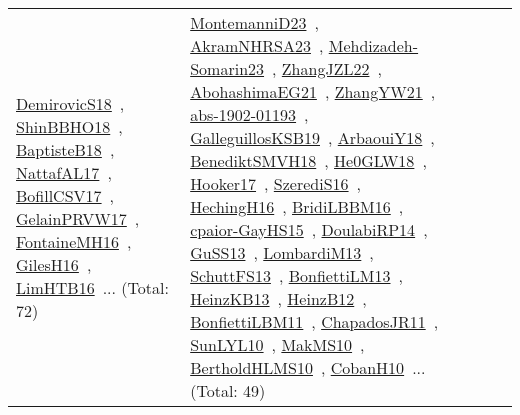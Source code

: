 {\begin{longtable}{lp{3cm}>{\raggedright\arraybackslash}p{6cm}>{\raggedright\arraybackslash}p{6cm}>{\raggedright\arraybackslash}p{8cm}}
\href{papers/DemirovicS18.pdf}{DemirovicS18}~\cite{DemirovicS18}, \href{articles/ShinBBHO18.pdf}{ShinBBHO18}~\cite{ShinBBHO18}, \href{articles/BaptisteB18.pdf}{BaptisteB18}~\cite{BaptisteB18}, \href{articles/NattafAL17.pdf}{NattafAL17}~\cite{NattafAL17}, \href{papers/BofillCSV17.pdf}{BofillCSV17}~\cite{BofillCSV17}, \href{papers/GelainPRVW17.pdf}{GelainPRVW17}~\cite{GelainPRVW17}, \href{papers/FontaineMH16.pdf}{FontaineMH16}~\cite{FontaineMH16}, \href{papers/GilesH16.pdf}{GilesH16}~\cite{GilesH16}, \href{papers/LimHTB16.pdf}{LimHTB16}~\cite{LimHTB16}... (Total: 72) & \href{articles/MontemanniD23.pdf}{MontemanniD23}~\cite{MontemanniD23}, \href{articles/AkramNHRSA23.pdf}{AkramNHRSA23}~\cite{AkramNHRSA23}, \href{papers/Mehdizadeh-Somarin23.pdf}{Mehdizadeh-Somarin23}~\cite{Mehdizadeh-Somarin23}, \href{papers/ZhangJZL22.pdf}{ZhangJZL22}~\cite{ZhangJZL22}, \href{articles/AbohashimaEG21.pdf}{AbohashimaEG21}~\cite{AbohashimaEG21}, \href{articles/ZhangYW21.pdf}{ZhangYW21}~\cite{ZhangYW21}, \href{articles/abs-1902-01193.pdf}{abs-1902-01193}~\cite{abs-1902-01193}, \href{papers/GalleguillosKSB19.pdf}{GalleguillosKSB19}~\cite{GalleguillosKSB19}, \href{papers/ArbaouiY18.pdf}{ArbaouiY18}~\cite{ArbaouiY18}, \href{papers/BenediktSMVH18.pdf}{BenediktSMVH18}~\cite{BenediktSMVH18}, \href{papers/He0GLW18.pdf}{He0GLW18}~\cite{He0GLW18}, \href{papers/Hooker17.pdf}{Hooker17}~\cite{Hooker17}, \href{papers/SzerediS16.pdf}{SzerediS16}~\cite{SzerediS16}, \href{papers/HechingH16.pdf}{HechingH16}~\cite{HechingH16}, \href{papers/BridiLBBM16.pdf}{BridiLBBM16}~\cite{BridiLBBM16}, \href{papers/cpaior-GayHS15.pdf}{cpaior-GayHS15}~\cite{cpaior-GayHS15}, \href{papers/DoulabiRP14.pdf}{DoulabiRP14}~\cite{DoulabiRP14}, \href{papers/GuSS13.pdf}{GuSS13}~\cite{GuSS13}, \href{papers/LombardiM13.pdf}{LombardiM13}~\cite{LombardiM13}, \href{papers/SchuttFS13.pdf}{SchuttFS13}~\cite{SchuttFS13}, \href{papers/BonfiettiLM13.pdf}{BonfiettiLM13}~\cite{BonfiettiLM13}, \href{papers/HeinzKB13.pdf}{HeinzKB13}~\cite{HeinzKB13}, \href{papers/HeinzB12.pdf}{HeinzB12}~\cite{HeinzB12}, \href{papers/BonfiettiLBM11.pdf}{BonfiettiLBM11}~\cite{BonfiettiLBM11}, \href{papers/ChapadosJR11.pdf}{ChapadosJR11}~\cite{ChapadosJR11}, \href{papers/SunLYL10.pdf}{SunLYL10}~\cite{SunLYL10}, \href{papers/MakMS10.pdf}{MakMS10}~\cite{MakMS10}, \href{papers/BertholdHLMS10.pdf}{BertholdHLMS10}~\cite{BertholdHLMS10}, \href{papers/CobanH10.pdf}{CobanH10}~\cite{CobanH10}... (Total: 49)\\

\end{longtable}}
